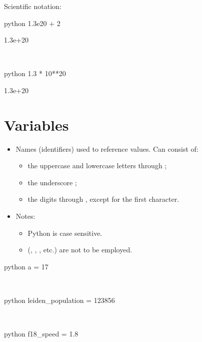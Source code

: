 \documentclass[aspectratio=1610,slidestop]{beamer}
\begin{document}
\begin{pframe}
Scientific notation:
\begin{ipython}
  \begin{pythonin}{python}
1.3e20 + 2
  \end{pythonin}
  \begin{pythonout}
1.3e+20
  \end{pythonout}
  \\

  \begin{pythonin}{python}
1.3 * 10**20
  \end{pythonin}
  \begin{pythonout}
1.3e+20
  \end{pythonout}
 \end{ipython}
\end{pframe}


\section{Variables}

\begin{pframe}
 \vspace{-0.75cm}
 \begin{itemize}
  \item Names (identifiers) used to reference values. Can consist of:
  \begin{itemize}
   \item the uppercase and lowercase letters  through ;
   \item the underscore \emp{\_};
   \item the digits  through , except for the first character.
  \end{itemize}
  \item Notes:
  \begin{itemize}
   \item Python is case sensitive.
   \item {} (, , , etc.)
   are not to be employed.
  \end{itemize}
 \end{itemize}

 \begin{ipython}
  \begin{pythonin}{python}
a = 17
  \end{pythonin}
  \\
  \begin{pythonin}{python}
leiden_population = 123856
  \end{pythonin}
  \\
  \begin{pythonin}{python}
f18_speed = 1.8
  \end{pythonin}
 \end{ipython}
\end{pframe}
\end{document}

